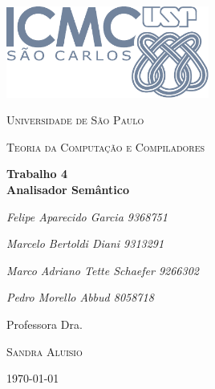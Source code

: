 \begin{titlepage}
  \centering
  \includegraphics[width=0.5\textwidth]{./assets/icmcLogo.pdf}\par\vspace{1cm}
  {\scshape\LARGE Universidade de São Paulo \par}
  \vspace{1cm}
  {\scshape\Large  Teoria da Computação e Compiladores  \par}
  \vspace{1.5cm}
  {\huge\bfseries Trabalho 4 \\ Analisador Semântico\par}
  \vspace{2cm}
  {\Large\itshape Felipe Aparecido Garcia 9368751\par}
  {\Large\itshape Marcelo Bertoldi Diani 9313291\par}
  {\Large\itshape Marco Adriano Tette Schaefer 9266302\par}
  {\Large\itshape Pedro Morello Abbud 8058718\par}

  \vfill
  Professora Dra.\par
  \textsc{Sandra Aluisio}

  \vfill

  {\large \today}
\end{titlepage}
